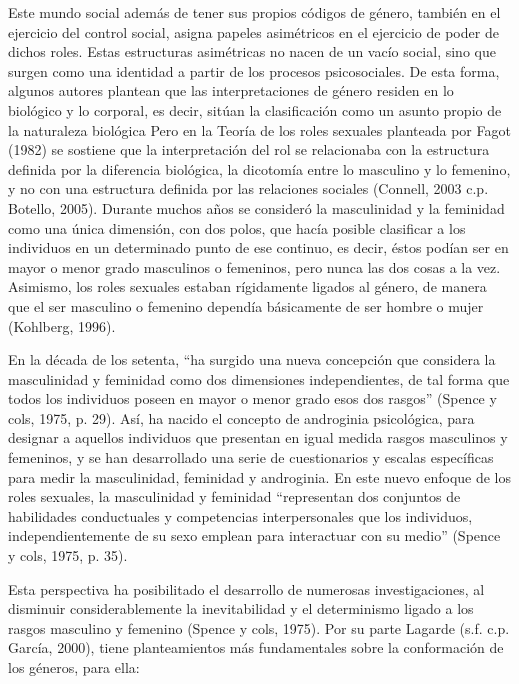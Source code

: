 Este mundo social además de tener sus propios códigos de género, también en el
ejercicio del control social, asigna papeles asimétricos en el ejercicio de
poder de dichos roles.
Estas estructuras asimétricas no nacen de un vacío social, sino que surgen como
una identidad a partir de los procesos psicosociales.
De esta forma, algunos autores plantean que las interpretaciones de género
residen en lo biológico y lo corporal, es decir, sitúan la clasificación como un
asunto propio de la naturaleza biológica
Pero en la Teoría de los roles sexuales planteada por Fagot (1982) se sostiene
que la interpretación del rol se relacionaba con la estructura definida por la
diferencia biológica, la dicotomía entre lo masculino y lo femenino, y no con
una estructura definida por las relaciones sociales (Connell, 2003 c.p.
Botello, 2005).
Durante muchos años se consideró la masculinidad y la feminidad como una única
dimensión, con dos polos, que hacía posible clasificar a los individuos en un
determinado punto de ese continuo, es decir, éstos podían ser en mayor o menor
grado masculinos o femeninos, pero nunca las dos cosas a la vez.
Asimismo, los roles sexuales estaban rígidamente ligados al género, de manera
que el ser masculino o femenino dependía básicamente de ser hombre o mujer
(Kohlberg, 1996).

En la década de los setenta, “ha surgido una nueva concepción que considera
la masculinidad y feminidad como dos dimensiones independientes, de tal forma
que todos los individuos poseen en mayor o menor grado esos dos rasgos”
(Spence y cols, 1975, p. 29).
Así, ha nacido el concepto de androginia psicológica, para designar a aquellos
individuos que presentan en igual medida rasgos masculinos y femeninos, y se han
desarrollado una serie de cuestionarios y escalas específicas para medir la
masculinidad, feminidad y androginia.
En este nuevo enfoque de los roles sexuales, la masculinidad y feminidad
“representan dos conjuntos de habilidades conductuales y competencias
interpersonales que los individuos, independientemente de su sexo emplean para
interactuar con su medio” (Spence y cols, 1975, p. 35).

Esta perspectiva ha posibilitado el desarrollo de numerosas investigaciones, al
disminuir considerablemente la inevitabilidad y el determinismo ligado a los
rasgos masculino y femenino (Spence y cols, 1975).
Por su parte Lagarde (s.f. c.p. García, 2000), tiene planteamientos más
fundamentales sobre la conformación de los géneros, para ella:

